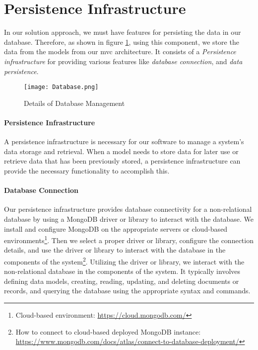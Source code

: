 \clearpage
\section{Persistence Infrastructure}
\label{sc:section:persistance}
In our solution approach, we must have features for persisting the data in our database.
Therefore, as shown in figure \ref{fig:sc:database}, using this component, we store the data from the models from our \ac{mvc} architecture.
It consists of a \textit{Persistence infrastructure} for providing various features like \textit{database connection}, and \textit{data persistence}.

\begin{figure}[htbp!]
    \centering    
    \texttt{[image: Database.png]} 
    \caption[Details of Database Management]{Details of Database Management}
    \label{fig:sc:database}
\end{figure}

\paragraph{Persistence Infrastructure}
A persistence infrastructure is necessary for our software to manage a system's data storage and retrieval. 
When a model needs to store data for later use or retrieve data that has been previously stored, a persistence infrastructure can provide the necessary functionality to accomplish this.

\paragraph{Database Connection}
Our persistence infrastructure provides database connectivity for a non-relational database by using a MongoDB driver or library to interact with the database. 
We install and configure MongoDB on the appropriate servers or cloud-based environments\footnote{Cloud-based environment: \url{https://cloud.mongodb.com/}}.
Then we select a proper driver or library, configure the connection details, and use the driver or library to interact with the database in the components of the system\footnote{How to connect to cloud-based deployed MongoDB instance: \url{https://www.mongodb.com/docs/atlas/connect-to-database-deployment/}}.
Utilizing the driver or library, we interact with the non-relational database in the components of the system. It typically involves defining data models, creating, reading, updating, and deleting documents or records, and querying the database using the appropriate syntax and commands.

